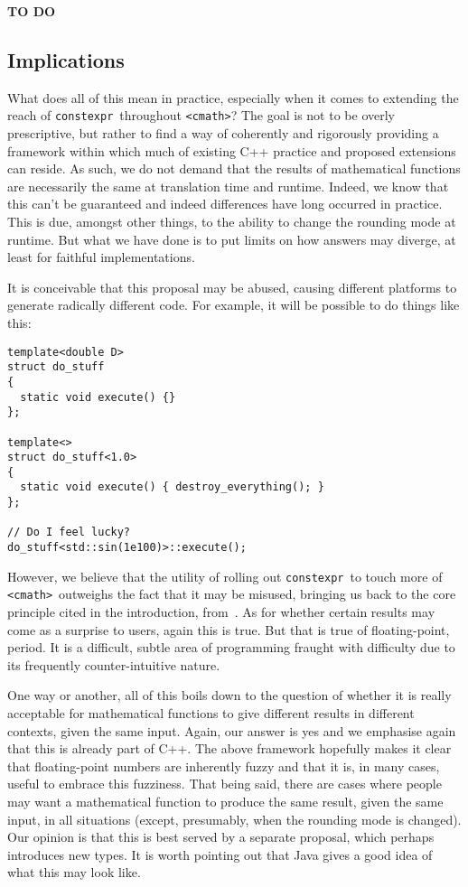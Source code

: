 \documentclass[prd,twocolumn,amsmath,amssymb,nofootinbib,eqsecnum]{revtex4-1}
\newcommand{\constexpr}{\code{constexpr}\xspace}
\newcommand{\code}[1]{{\tt #1}}
\newcommand{\header}[1]{{\tt <#1>}}
\newcommand{\cmath}{\header{cmath}}
\begin{document}
{\bf TO DO}

\subsection{Implications}

What does all of this mean in practice, especially when it comes to extending the reach of \constexpr\ throughout \cmath? The goal is not to be overly prescriptive, but rather to find a way of coherently and rigorously providing a framework  within which much of existing C++ practice and proposed extensions can reside. As such, we do not demand that the results of mathematical functions are necessarily the same at translation time and runtime. Indeed, we know that this can't be guaranteed and indeed differences have long occurred in practice. This is due, amongst other things, to the ability to change the rounding mode at runtime. But what we have done is to put limits on how answers may diverge, at least for faithful implementations.

It is conceivable that this proposal may be abused, causing different platforms to generate radically
different code. For example, it will be possible to do things like this:
\begin{verbatim}
template<double D>
struct do_stuff
{
  static void execute() {}
};

template<>
struct do_stuff<1.0>
{
  static void execute() { destroy_everything(); }
};

// Do I feel lucky?
do_stuff<std::sin(1e100)>::execute();
\end{verbatim}

However, we believe that the utility of rolling out \constexpr\ to touch more of \cmath\ outweighs the fact that it may be misused, bringing us back to the core principle cited in the introduction, from~\cite{DandE}.
As for whether certain results may come as a surprise to users, again this is true. But that
is true of floating-point, period. It is a difficult, subtle area of programming fraught with difficulty
due to its frequently counter-intuitive nature.

One way or another, all of this boils down to the question of whether it is really acceptable for mathematical functions to give different results in different contexts, given the same input. Again, our answer is yes and we emphasise again that this is already part of C++. The above framework hopefully makes it clear that floating-point numbers are inherently fuzzy and that it is, in many cases, useful to embrace this fuzziness. That being said, there are cases where people may want a mathematical function to produce the same result, given the same input, in all situations (except, presumably, when the rounding mode is changed). Our opinion is that this is best served by a separate proposal, which
perhaps introduces new types. It is worth pointing out that Java gives a good idea of what this
may look like.
\end{document}
